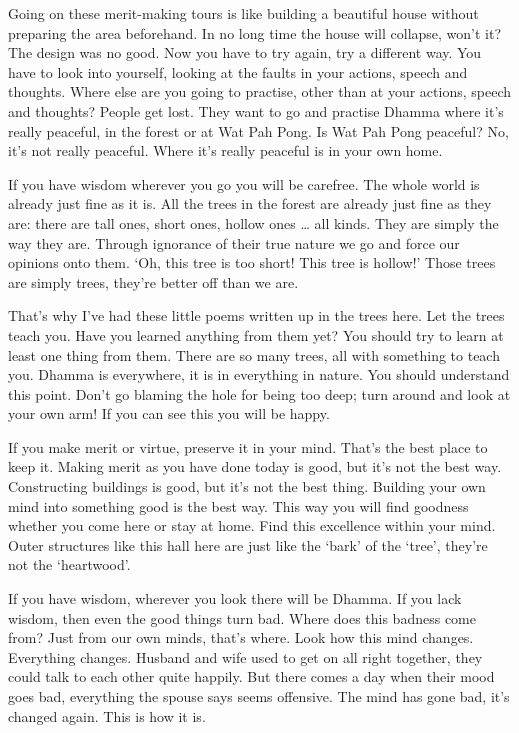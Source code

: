 Going on these merit-making tours is like building a beautiful house without preparing the area beforehand. In no long time the house will collapse, won't it? The design was no good. Now you have to try again, try a different way. You have to look into yourself, looking at the faults in your actions, speech and thoughts. Where else are you going to practise, other than at your actions, speech and thoughts? People get lost. They want to go and practise Dhamma where it's really peaceful, in the forest or at Wat Pah Pong. Is Wat Pah Pong peaceful? No, it's not really peaceful. Where it's really peaceful is in your own home.

If you have wisdom wherever you go you will be carefree. The whole world is already just fine as it is. All the trees in the forest are already just fine as they are: there are tall ones, short ones, hollow ones \ldots{} all kinds. They are simply the way they are. Through ignorance of their true nature we go and force our opinions onto them. `Oh, this tree is too short! This tree is hollow!' Those trees are simply trees, they're better off than we are.

That's why I've had these little poems written up in the trees here. Let the trees teach you. Have you learned anything from them yet? You should try to learn at least one thing from them. There are so many trees, all with something to teach you. Dhamma is everywhere, it is in everything in nature. You should understand this point. Don't go blaming the hole for being too deep; turn around and look at your own arm! If you can see this you will be happy.

If you make merit or virtue, preserve it in your mind. That's the best place to keep it. Making merit as you have done today is good, but it's not the best way. Constructing buildings is good, but it's not the best thing. Building your own mind into something good is the best way. This way you will find goodness whether you come here or stay at home. Find this excellence within your mind. Outer structures like this hall here are just like the `bark' of the `tree', they're not the `heartwood'.

If you have wisdom, wherever you look there will be Dhamma. If you lack wisdom, then even the good things turn bad. Where does this badness come from? Just from our own minds, that's where. Look how this mind changes. Everything changes. Husband and wife used to get on all right together, they could talk to each other quite happily. But there comes a day when their mood goes bad, everything the spouse says seems offensive. The mind has gone bad, it's changed again. This is how it is.

